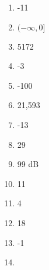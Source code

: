 \documentclass[../uilmath.tex]{subfiles}
\begin{document}
\begin{enumerate}[label=\bfseries\arabic*.]
    \item %
    -11

    \item %
    $(-\infty, 0]$

    \item %
    5172

    \item %
    -3

    \item %
    -100

    \item %
    21,593

    \item %
    -13

    \item %
    29

    \item %
    99 dB

    \item %
    11
    
    \item %
    4

    \item %
    18

    \item %
    -1

    \item %
    
\end{enumerate}
\end{document}
